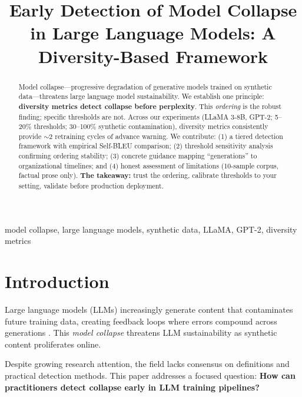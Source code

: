 \documentclass[conference]{IEEEtran}
\begin{document}
\title{Early Detection of Model Collapse in Large Language Models: A Diversity-Based Framework}

\author{
}

\maketitle

\begin{abstract}
Model collapse---progressive degradation of generative models trained on synthetic data---threatens large language model sustainability. We establish one principle: \textbf{diversity metrics detect collapse before perplexity}. This \textit{ordering} is the robust finding; specific thresholds are not. Across our experiments (LLaMA 3-8B, GPT-2; 5--20\% thresholds; 30--100\% synthetic contamination), diversity metrics consistently provide $\sim$2 retraining cycles of advance warning. We contribute: (1) a tiered detection framework with empirical Self-BLEU comparison; (2) threshold sensitivity analysis confirming ordering stability; (3) concrete guidance mapping ``generations'' to organizational timelines; and (4) honest assessment of limitations (10-sample corpus, factual prose only). \textbf{The takeaway:} trust the ordering, calibrate thresholds to your setting, validate before production deployment.
\end{abstract}

\begin{IEEEkeywords}
model collapse, large language models, synthetic data, LLaMA, GPT-2, diversity metrics
\end{IEEEkeywords}

\section{Introduction}

Large language models (LLMs) increasingly generate content that contaminates future training data, creating feedback loops where errors compound across generations \cite{shumailov2024nature, shumailov2023curse}. This \textit{model collapse} threatens LLM sustainability as synthetic content proliferates online.

Despite growing research attention, the field lacks consensus on definitions \cite{schaeffer2025position} and practical detection methods. This paper addresses a focused question: \textbf{How can practitioners detect collapse early in LLM training pipelines?}
\end{document}
